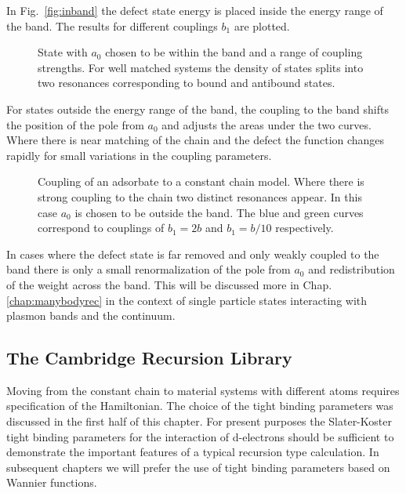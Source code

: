 In Fig.~\ref{fig:inband} the defect state energy is placed inside the energy range of the band. The
results for different couplings $b_{1}$ are plotted.
%
\begin{figure}
\begin{center}
{\graphicspath{{./invariance/chain_figs/}}}
\caption{State with $a_{0}$ chosen to be within the band and a range of coupling strengths. 
For well matched systems the density of states splits into two resonances corresponding 
to bound and antibound states.}
\end{center}
\end{figure}
%

For states outside the energy range of the band, the coupling to the band shifts the position
of the pole from $a_{0}$ and adjusts the areas under the two curves. Where there is 
near matching of the chain and the defect the function changes rapidly for small
variations in the coupling parameters.
%
\begin{figure}
\begin{center}
{\graphicspath{{./invariance/chain_figs/}}}
\caption{Coupling of an adsorbate to a constant chain model. Where there is strong coupling
to the chain two distinct resonances appear. In this case $a_{0}$ is chosen to be outside the band.
The blue and green curves correspond to couplings of $b_{1}=2b$ and $b_{1}=b/10$ respectively.
\label{fig:gfconstchain}}
\end{center}
\end{figure}
%
In cases where the defect state is far removed and only weakly coupled to the band
there is only a small renormalization of the pole from $a_{0}$ and redistribution of the weight across the band.
This will be discussed more in Chap.\ref{chap:manybodyrec} in the context of single particle states
interacting with plasmon bands and the continuum.

\subsection{The Cambridge Recursion Library}
Moving from the constant chain to material systems with different atoms requires specification
of the Hamiltonian. The choice of the tight binding parameters was discussed in the first half of this
chapter. For present purposes the Slater-Koster tight binding parameters for the interaction of 
d-electrons should be sufficient to demonstrate the important features of a typical recursion type calculation.
In subsequent chapters we will prefer the use of tight binding parameters based on Wannier functions.


